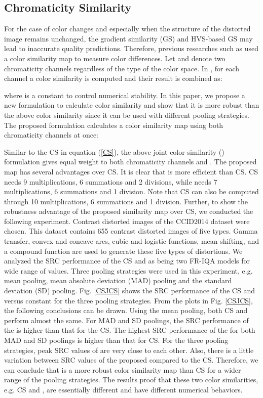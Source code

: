 \subsection{Chromaticity Similarity}
\label{Chromaticity}

For the case of color changes and especially when the structure of the distorted image remains unchanged, the gradient similarity (GS) and HVS-based GS may lead to inaccurate quality predictions. Therefore, previous researches such as \cite{FSIM, VSI} used a color similarity map to measure color differences. Let  and  denote two chromaticity channels regardless of the type of the color space. In \cite{FSIM, VSI}, for each channel a color similarity is computed and their result is combined as:
                    
where  is a constant to control numerical stability. In this paper, we propose a new formulation to calculate color similarity and show that it is more robust than the above color similarity since it can be used with different pooling strategies. The proposed formulation calculates a color similarity map using both chromaticity channels at once:    
                    


Similar to the CS in equation (\ref{CS}), the above joint color similarity () formulation gives equal weight to both chromaticity channels  and . The proposed  map has several advantages over CS. It is clear that  is more efficient than CS. CS needs 9 multiplications, 6 summations and 2 divisions, while  needs 7 multiplications, 6 summations and 1 division. Note that CS can also be computed through 10 multiplications, 6 summations and 1 division. Further, to show the robustness advantage of the proposed similarity map  over CS, we conducted the following experiment. Contrast distorted images of the CCID2014 dataset \cite{CCID2014} were chosen. This dataset contains 655 contrast distorted images of five types. Gamma transfer, convex and concave arcs, cubic and logistic functions, mean shifting, and a compound function are used to generate these five types of distortions. We analyzed the SRC performance of the CS and  as being two FR-IQA models for wide range of  values. Three pooling strategies were used in this experiment, e.g. mean pooling, mean absolute deviation (MAD) pooling and the standard deviation (SD) pooling. Fig. \ref{CSJCS} shows the SRC performance of the CS and  versus constant  for the three pooling strategies. From the plots in Fig. \ref{CSJCS}, the following conclusions can be drawn. Using the mean pooling, both CS and  perform almost the same. For MAD and SD poolings, the SRC performance of the  is higher than that for the CS. The highest SRC performance of the  for both MAD and SD poolings is higher than that for CS. For the three pooling strategies, peak SRC values of  are very close to each other. Also, there is a little variation between SRC values of the proposed  compared to the CS. Therefore, we can conclude that  is a more robust color similarity map than CS for a wider range of the pooling strategies. The results proof that these two color similarities, e.g. CS and , are essentially different and have different numerical behaviors. 



